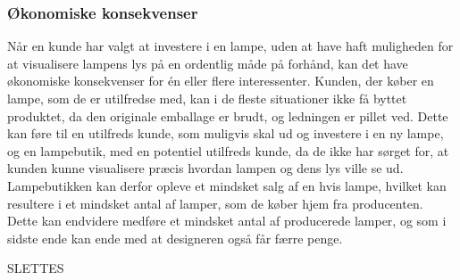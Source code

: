 \subsubsection{Økonomiske konsekvenser}
Når en kunde har valgt at investere i en lampe, uden at have haft muligheden for at visualisere lampens lys på en ordentlig måde på forhånd, kan det have økonomiske konsekvenser for én eller flere interessenter. Kunden, der køber en lampe, som de er utilfredse med, kan i de fleste situationer ikke få byttet produktet, da den originale emballage er brudt, og ledningen er pillet ved. Dette kan føre til en utilfreds kunde, som muligvis skal ud og investere i en ny lampe, og en lampebutik, med en potentiel utilfreds kunde, da de ikke har sørget for, at kunden kunne visualisere præcis hvordan lampen og dens lys ville se ud. Lampebutikken kan derfor opleve et mindsket salg af en hvis lampe, hvilket kan resultere i et mindsket antal af lamper, som de køber hjem fra producenten. Dette kan endvidere medføre et mindsket antal af producerede lamper, og som i sidste ende kan ende med at designeren også får færre penge.


SLETTES